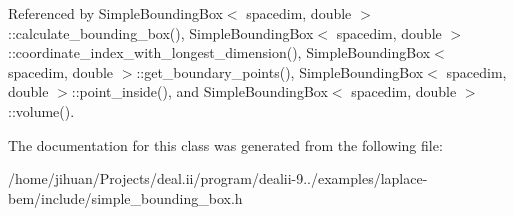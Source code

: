 Referenced by Simple\+Bounding\+Box$<$ spacedim, double $>$\+::calculate\+\_\+bounding\+\_\+box(), Simple\+Bounding\+Box$<$ spacedim, double $>$\+::coordinate\+\_\+index\+\_\+with\+\_\+longest\+\_\+dimension(), Simple\+Bounding\+Box$<$ spacedim, double $>$\+::get\+\_\+boundary\+\_\+points(), Simple\+Bounding\+Box$<$ spacedim, double $>$\+::point\+\_\+inside(), and Simple\+Bounding\+Box$<$ spacedim, double $>$\+::volume().



The documentation for this class was generated from the following file\+:\begin{DoxyCompactItemize}
\item 
/home/jihuan/\+Projects/deal.\+ii/program/dealii-\/9../examples/laplace-\/bem/include/simple\+\_\+bounding\+\_\+box.\+h\end{DoxyCompactItemize}
